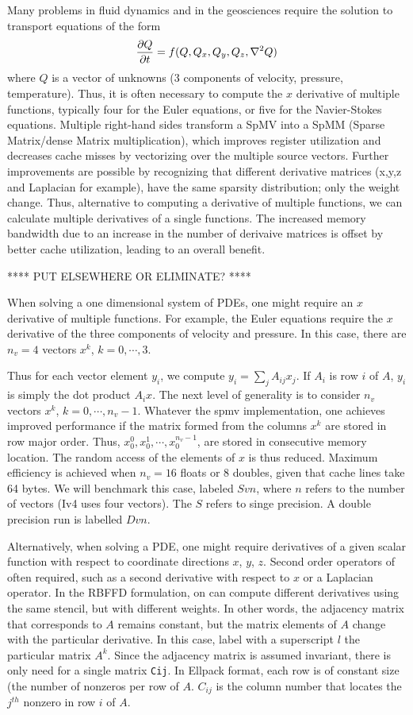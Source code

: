 \documentclass[10pt, conference, compsocconf]{IEEEtran}
\def\ttt#1{{\tt #1}}
\begin{document}
Many problems in fluid dynamics and in the geosciences require the solution to
transport equations of the form
$$
{\frac{\partial{Q}}{\partial{t}}} = f(Q,Q_x, Q_y, Q_z, \nabla^2 Q)
$$ 
where $Q$ is a vector of unknowns (3 components of velocity,
pressure, temperature). Thus, it is often necessary to compute the $x$
derivative of multiple functions, typically four for the Euler
equations, or five for the Navier-Stokes equations. Multiple
right-hand sides transform a SpMV into a SpMM (Sparse Matrix/dense
Matrix multiplication), which improves register utilization and
decreases cache misses by vectorizing over the multiple source
vectors. Further improvements are possible by recognizing that
different derivative matrices (x,y,z and Laplacian for example), have
the same sparsity distribution; only the weight change.  Thus,
alternative to computing a derivative of multiple functions, we can
calculate multiple derivatives of a single functions. The increased
memory bandwidth due to an increase in the number of derivaive
matrices is offset by better cache utilization, leading to an overall
benefit.


**** PUT ELSEWHERE OR ELIMINATE? ****

When solving a one dimensional system of PDEs, one might require an
$x$ derivative of multiple functions. For example, the Euler equations
require the $x$ derivative of the three components of velocity and
pressure. In this case, there are $n_v=4$ vectors $x^k$,
$k=0,\cdots,3$.

Thus for each vector element $y_i$, we compute $y_i = \sum_j A_{ij}
x_j$. If $A_i$ is row $i$ of $A$, $y_i$ is simply the dot product $A_i
x$. The next level of generality is to consider $n_v$ vectors $x^k$,
$k=0,\cdots,n_v-1$. Whatever the spmv implementation, one achieves
improved performance if the matrix formed from the columns $x^k$ are
stored in row major order. Thus, $x^0_0,x^1_0,\cdots,x^{n_v-1}_0$, are
stored in consecutive memory location. The random access of the
elements of $x$ is thus reduced. Maximum efficiency is achieved when
$n_v=16$ floats or $8$ doubles, given that cache lines take 64
bytes. We will benchmark this case, labeled $Svn$, where $n$ refers to
the number of vectors (Iv4 uses four vectors). The $S$ refers to singe
precision. A double precision run is labelled $Dvn$.

Alternatively, when solving a PDE, one might require derivatives of a
given scalar function with respect to coordinate directions $x$, $y$,
$z$. Second order operators of often required, such as a second
derivative with respect to $x$ or a Laplacian operator. In the RBFFD
formulation, on can compute different derivatives using the same
stencil, but with different weights. In other words, the adjacency
matrix that corresponds to $A$ remains constant, but the matrix
elements of $A$ change with the particular derivative.  In this case,
label with a superscript $l$ the particular matrix $A^k$. Since the
adjacency matrix is assumed invariant, there is only need for a single
matrix \ttt{C{ij}}. In Ellpack format, each row is of constant size
(the number of nonzeros per row of $A$. $C_{ij}$ is the column number
that locates the $j^{th}$ nonzero in row $i$ of $A$.
\end{document}
